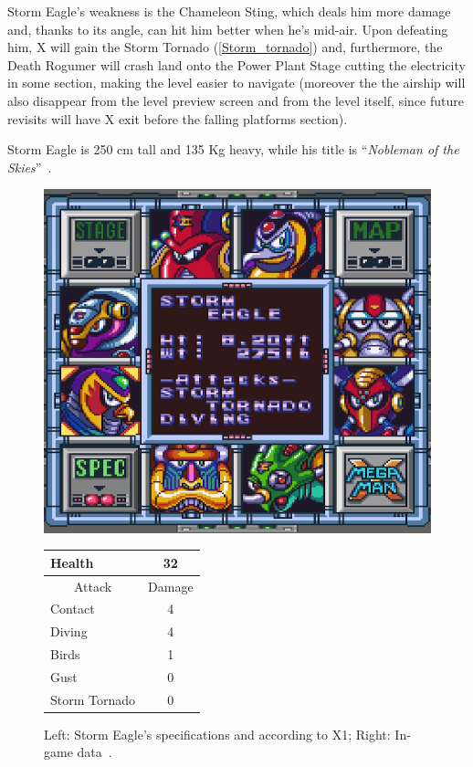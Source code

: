  Storm Eagle's weakness is the Chameleon Sting, which deals him more damage and, thanks to its angle, can hit him better when he's mid-air. Upon defeating him, X will gain the Storm Tornado (\ref{Storm_tornado}) and, furthermore, the Death Rogumer will crash land onto the Power Plant Stage cutting the electricity in some section, making the level easier to navigate (moreover the the airship will also disappear from the level preview screen and from the level itself, since future revisits will have X exit before the falling platforms section).
 
 Storm Eagle is 250 cm tall and 135 Kg heavy, while his title is ``\textit{Nobleman of the Skies}''~\cite{book:MMX_Complete_art}.

\begin{figure}[htp]
	\begin{minipage}[c]{0.45\linewidth}
		\vspace{0pt}
		\centering
		\includegraphics[width=\linewidth]{figures/X1/Storm_eagle/Storm_eagle_specs.png}
	\end{minipage}
	\begin{minipage}[c]{0.45\linewidth}
		\centering
		\vspace{0pt}
		\begin{tabular}[h]{l c}
			\toprule
			Health  & 32\\
			\midrule
			\multicolumn{1}{c}{Attack} & \multicolumn{1}{c}{Damage}\\
			Contact & 4\\
			Diving & 4\\
			Birds & 1\\
			Gust & 0\\
			Storm Tornado & 0\\
			\bottomrule
		\end{tabular}
	\end{minipage}
	\caption{Left: Storm Eagle's specifications and according to X1; Right: In-game data~\cite{wiki:Storm_eagle}. }
	\label{Eagle_specs}
\end{figure}

